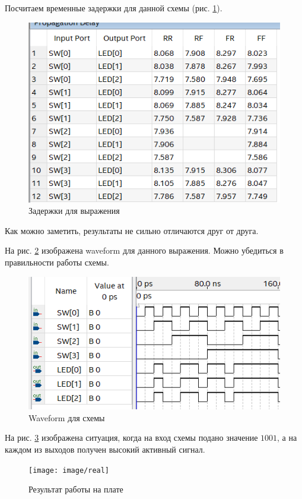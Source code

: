 \documentclass[a4paper,14pt]{article}
\begin{document}
Посчитаем временные задержки для данной схемы (рис. \ref{fig:time}).

\begin{figure}[H]
	\centering
	\includegraphics[width=0.8\linewidth]{image/time}
	\caption{Задержки для выражения}
	\label{fig:time}
\end{figure}

Как можно заметить, результаты не сильно отличаются друг от друга.

На рис. \ref{fig:wave} изображена waveform для данного выражения.
Можно убедиться в правильности работы схемы.

\begin{figure}[H]
	\centering
	\includegraphics[width=0.8\linewidth]{image/wave}
	\caption{Waveform для схемы}
	\label{fig:wave}
\end{figure}


На рис. \ref{fig:real} изображена ситуация, когда на вход схемы подано значение $1001$, а на каждом из выходов получен высокий активный сигнал.

\begin{figure}[H]
	\centering
	\texttt{[image: image/real]}
	\caption{Результат работы на плате}
	\label{fig:real}
\end{figure}
\end{document}
